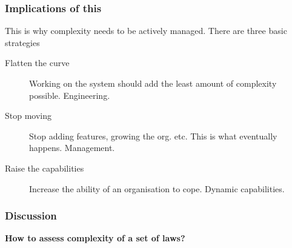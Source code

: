 \documentclass[10pt, compress]{beamer}
\begin{document}
\begin{frame}
	\frametitle{Implications of this}
	
	This is why complexity needs to be actively managed. There are three basic strategies
	\begin{description}
		\item[Flatten the curve] Working on the system should add the least amount of complexity possible. Engineering.
		\item[Stop moving] Stop adding features, growing the org. etc. This is what eventually happens. Management. 
		\item[Raise the capabilities] Increase the ability of an organisation to cope. Dynamic capabilities.
	\end{description}
\end{frame}

\begin{frame}[fragile]
  \frametitle{Discussion}
		\begin{center}
			\textbf{How to assess complexity of a set of laws?}
		\end{center}
\end{frame}
\end{document}

